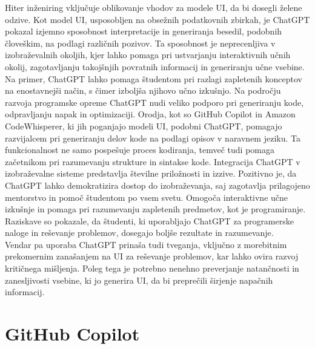 \documentclass[a4paper,12pt,openright]{book}
\begin{document}
Hiter inženiring vključuje oblikovanje vhodov za modele UI, da bi dosegli želene odzive. Kot model UI, usposobljen na obsežnih podatkovnih zbirkah, je ChatGPT pokazal izjemno sposobnost interpretacije in generiranja besedil, podobnih človeškim, na podlagi različnih pozivov. Ta sposobnost je neprecenljiva v izobraževalnih okoljih, kjer lahko pomaga pri ustvarjanju interaktivnih učnih okolij, zagotavljanju takojšnjih povratnih informacij in generiranju učne vsebine. Na primer, ChatGPT lahko pomaga študentom pri razlagi zapletenih konceptov na enostavnejši način, s čimer izboljša njihovo učno izkušnjo.
Na področju razvoja programske opreme ChatGPT nudi veliko podporo pri generiranju kode, odpravljanju napak in optimizaciji. Orodja, kot so GitHub Copilot in Amazon CodeWhisperer, ki jih poganjajo modeli UI, podobni ChatGPT, pomagajo razvijalcem pri generiranju delov kode na podlagi opisov v naravnem jeziku. Ta funkcionalnost ne samo pospešuje proces kodiranja, temveč tudi pomaga začetnikom pri razumevanju strukture in sintakse kode.
Integracija ChatGPT v izobraževalne sisteme predstavlja številne priložnosti in izzive. Pozitivno je, da ChatGPT lahko demokratizira dostop do izobraževanja, saj zagotavlja prilagojeno mentorstvo in pomoč študentom po vsem svetu. Omogoča interaktivne učne izkušnje in pomaga pri razumevanju zapletenih predmetov, kot je programiranje. Raziskave so pokazale, da študenti, ki uporabljajo ChatGPT za programerske naloge in reševanje problemov, dosegajo boljše rezultate in razumevanje. \\
Vendar pa uporaba ChatGPT prinaša tudi tveganja, vključno z morebitnim prekomernim zanašanjem na UI za reševanje problemov, kar lahko ovira razvoj kritičnega mišljenja. Poleg tega je potrebno nenehno preverjanje natančnosti in zanesljivosti vsebine, ki jo generira UI, da bi preprečili širjenje napačnih informacij. \cite{app13095783}
\section{GitHub Copilot}
\end{document}
